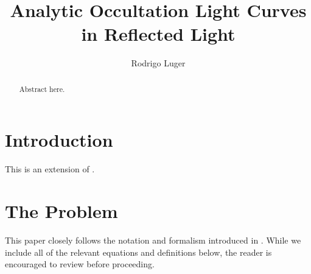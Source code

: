 \documentclass[modern]{aastex62}
\begin{document}
\title{Analytic Occultation Light Curves in Reflected Light}

\author[0000-0002-0296-3826]{Rodrigo Luger}
%

\begin{abstract}
    Abstract here.
    \href{https://github.com/rodluger/starrynight}{\color{linkcolor}\faGithub}
\end{abstract}

%
\section{Introduction}
\label{sec:intro}
%
This is an extension of \citet{Luger2019}.

%
\section{The Problem}
\label{sec:the-problem}
%
This paper closely follows the
notation and formalism introduced in \citet{Luger2019}. While we
include all of the relevant equations and definitions below,
the reader is encouraged to
review \citet{Luger2019} before proceeding.
\end{document}
